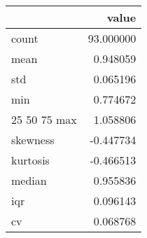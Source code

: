 \begin{tabular}{lr}
\toprule
 & value \\
\midrule
count & 93.000000 \\
mean & 0.948059 \\
std & 0.065196 \\
min & 0.774672 \\
25%
50%
75%
max & 1.058806 \\
skewness & -0.447734 \\
kurtosis & -0.466513 \\
median & 0.955836 \\
iqr & 0.096143 \\
cv & 0.068768 \\
\bottomrule
\end{tabular}
